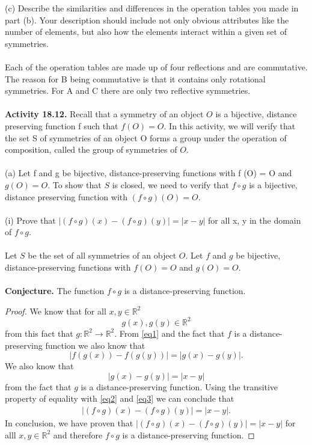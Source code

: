 \documentclass[11pt,a4paper]{article}
\begin{document}
(c) Describe the similarities and differences in the operation tables you made in part (b). Your description should include not only obvious attributes like the number of elements, but also how the elements interact within a given set of symmetries.\\
~\\
Each of the operation tables are made up of four reflections and are commutative. The reason for B being commutative is that it contains only rotational symmetries. For A and C there are only two reflective symmetries.\\
~\vspace{10mm}\\
{\bf Activity 18.12.} Recall that a symmetry of an object $O$ is a bijective, distance preserving function f such that $f (O) = O$. In this activity, we will verify that the set S of symmetries of an object O forms a group under the operation of composition, called the group of symmetries of $O$.\\
~\\
(a) Let f and g be bijective, distance-preserving functions with f (O) = O
and $g(O) = O$. To show that $S$ is closed, we need to verify that $f \circ g$ is a
bijective, distance preserving function with $(f \circ g)(O) = O$.\\
~\\
(i) Prove that $|(f \circ g)(x) − (f \circ g)(y)| = |x − y|$ for all x, y in the
domain of $f \circ g$.\\
~\\
Let $S$ be the set of all symmetries of an object $O$. Let $f$ and $g$ be bijective, distance-preserving functions with $f(O)=O$ and $g(O)=O$.\\
~\\
{\bf Conjecture.} The function $f\circ g$ is a distance-preserving function.\\
\begin{proof}
We know that for all $x,y\in\mathbb{R}^2$
\begin{equation}\label{eq1}
g(x),g(y)\in\mathbb{R}^2
\end{equation}
from this fact that $g:\mathbb{R}^2\rightarrow\mathbb{R}^2$. From \eqref{eq1}  and the fact that $f$ is a distance-preserving function we also know that
\begin{equation}\label{eq2}
|f(g(x))-f(g(y))| = |g(x)-g(y)|.
\end{equation}
We also know that
\begin{equation}\label{eq3}
|g(x)-g(y)| = |x-y|
\end{equation}
from the fact that $g$ is a distance-preserving function. Using the transitive property of equality with \eqref{eq2} and \eqref{eq3} we can conclude that
\begin{align*}
|(f\circ g)(x)-(f\circ g)(y)| = |x-y|.
\end{align*}
In conclusion, we have proven that $|(f\circ g)(x)-(f\circ g)(y)| = |x-y|$ for alll $x,y\in\mathbb{R}^2$ and therefore $f\circ g$ is a distance-preserving function.
\end{proof}
\end{document}

